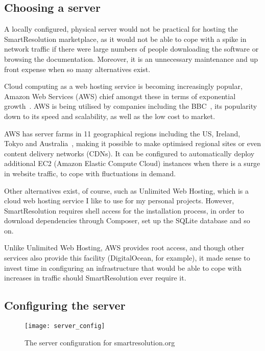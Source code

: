 \subsection{Choosing a server}

A locally configured, physical server would not be practical for hosting the SmartResolution marketplace, as it would not be able to cope with a spike in network traffic if there were large numbers of people downloading the software or browsing the documentation. Moreover, it is an unnecessary maintenance and up front expense when so many alternatives exist.

Cloud computing as a web hosting service is becoming increasingly popular, Amazon Web Services (AWS) chief amongst these in terms of exponential growth~\cite{article:AWS}. AWS is being utilised by companies including the BBC~\cite{article:bbcAws}, its popularity down to its speed and scalability, as well as the low cost to market.

AWS has server farms in 11 geographical regions including the US, Ireland, Tokyo and Australia~\cite{aws:global}, making it possible to make optimised regional sites or even content delivery networks (CDNs). It can be configured to automatically deploy additional EC2 (Amazon Elastic Compute Cloud) instances when there is a surge in website traffic, to cope with fluctuations in demand.

Other alternatives exist, of course, such as Unlimited Web Hosting, which is a cloud web hosting service I like to use for my personal projects. However, SmartResolution requires shell access for the installation process, in order to download dependencies through Composer, set up the SQLite database and so on.

Unlike Unlimited Web Hosting, AWS provides root access, and though other services also provide this facility (DigitalOcean, for example), it made sense to invest time in configuring an infrastructure that would be able to cope with increases in traffic should SmartResolution ever require it.

\subsection{Configuring the server}

\begin{figure}[h!]
  \centering
    \ifimages
    \texttt{[image: server\_config]}
    \fi
  \caption{The server configuration for smartresolution.org}
  \label{uml:serverConfig}
\end{figure}

